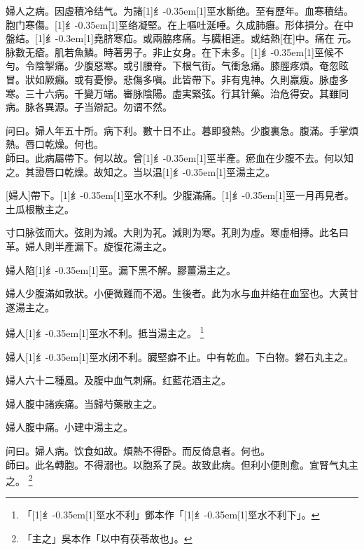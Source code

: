 \documentclass[11pt,oneside,b5paper]{ctexbook}
\begin{document}
\begin{flushleft}
婦人之病。因虛積冷结气。为諸{\hbox{\scalebox{0.68}[1]{纟}\kern-0.35em\scalebox{0.64}[1]{巠}}}水斷绝。至有歷年。血寒積结。胞门寒傷。{\hbox{\scalebox{0.68}[1]{纟}\kern-0.35em\scalebox{0.64}[1]{巠}}}络凝堅。在上嘔吐涎唾。久成肺癰。形体損分。在中盤结。{\hbox{\scalebox{0.6}[1]{纟}\kern-0.3em\scalebox{0.63}[1]{堯}}}脐寒疝。或兩脇疼痛。与臓相連。或结熱[在]中。痛在{𬮦}元。脉數无瘡。肌若魚鱗。時著男子。非止女身。在下未多。{\hbox{\scalebox{0.68}[1]{纟}\kern-0.35em\scalebox{0.64}[1]{巠}}}候不勻。令陰掣痛。少腹惡寒。或引腰脊。下根气街。气衝急痛。膝脛疼煩。奄忽眩冒。狀如厥癲。或有憂慘。悲傷多嗔。此皆帶下。非有鬼神。久則羸瘦。脉虛多寒。三十六病。千變万端。審脉陰陽。虛実緊弦。行其针藥。治危得安。其雖同病。脉各異源。子当辯記。勿谓不然。

问曰。婦人年五十所。病下利。數十日不止。暮即發熱。少腹裏急。腹滿。手掌煩熱。唇口乾燥。何也。\\
師曰。此病屬帶下。何以故。曾{\hbox{\scalebox{0.68}[1]{纟}\kern-0.35em\scalebox{0.64}[1]{巠}}}半產。瘀血在少腹不去。何以知之。其證唇口乾燥。故知之。当以温{\hbox{\scalebox{0.68}[1]{纟}\kern-0.35em\scalebox{0.64}[1]{巠}}}湯主之。

[婦人]帶下。{\hbox{\scalebox{0.68}[1]{纟}\kern-0.35em\scalebox{0.64}[1]{巠}}}水不利。少腹滿痛。{\hbox{\scalebox{0.68}[1]{纟}\kern-0.35em\scalebox{0.64}[1]{巠}}}一月再見者。土瓜根散主之。

寸口脉弦而大。弦則为減。大則为芤。減則为寒。芤則为虛。寒虛相摶。此名曰革。婦人則半產漏下。旋復花湯主之。

婦人陷{\hbox{\scalebox{0.68}[1]{纟}\kern-0.35em\scalebox{0.64}[1]{巠}}}。漏下黑不解。膠薑湯主之。

婦人少腹滿如敦狀。小便微難而不渴。生後者。此为水与血并结在血室也。大黄甘遂湯主之。

婦人{\hbox{\scalebox{0.68}[1]{纟}\kern-0.35em\scalebox{0.64}[1]{巠}}}水不利。抵当湯主之。
\footnote{「{\hbox{\scalebox{0.68}[1]{纟}\kern-0.35em\scalebox{0.64}[1]{巠}}}水不利」鄧本作「{\hbox{\scalebox{0.68}[1]{纟}\kern-0.35em\scalebox{0.64}[1]{巠}}}水不利下」。}

婦人{\hbox{\scalebox{0.68}[1]{纟}\kern-0.35em\scalebox{0.64}[1]{巠}}}水闭不利。臓堅癖不止。中有乾血。下白物。礬石丸主之。

婦人六十二種風。及腹中血气刺痛。红藍花酒主之。

婦人腹中諸疾痛。当歸芍藥散主之。

婦人腹中痛。小建中湯主之。

问曰。婦人病。饮食如故。煩熱不得卧。而反倚息者。何也。\\
師曰。此名轉胞。不得溺也。以胞系了戾。故致此病。但利小便則愈。宜腎气丸主之。
\footnote{「主之」吳本作「以中有茯苓故也」。}


\end{flushleft}
\end{document}
